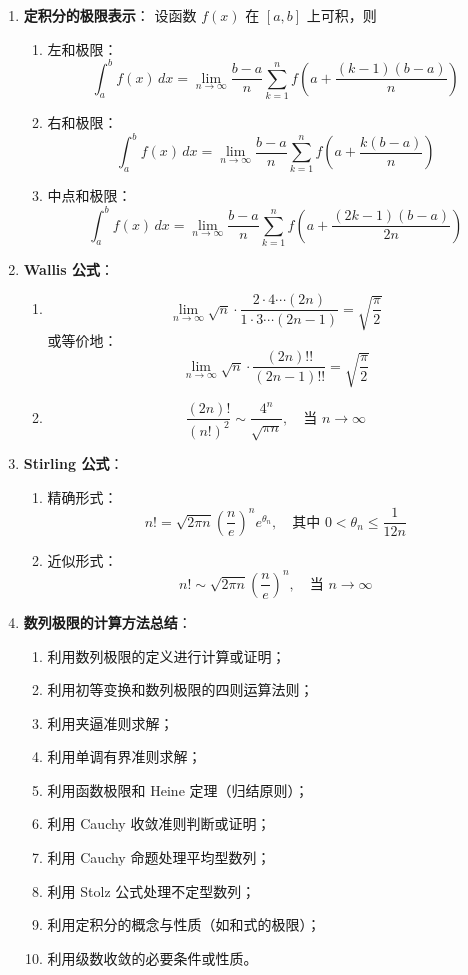 \documentclass[UTF8]{ctexart}
\theoremstyle{remark}
\begin{document}
\begin{enumerate}
				\item \textbf{定积分的极限表示}：
				设函数 $ f(x) $ 在 $[a, b]$ 上可积，则
				\begin{enumerate}
					\item 左和极限：
					$$
					\int_a^b f(x)\,dx = \lim_{n \to \infty} \frac{b - a}{n} \sum_{k=1}^{n} f\left(a + \frac{(k - 1)(b - a)}{n}\right)
					$$
					\item 右和极限：
					$$
					\int_a^b f(x)\,dx = \lim_{n \to \infty} \frac{b - a}{n} \sum_{k=1}^{n} f\left(a + \frac{k(b - a)}{n}\right)
					$$
					\item 中点和极限：
					$$
					\int_a^b f(x)\,dx = \lim_{n \to \infty} \frac{b - a}{n} \sum_{k=1}^{n} f\left(a + \frac{(2k - 1)(b - a)}{2n}\right)
					$$
				\end{enumerate}
				
				\item \textbf{Wallis 公式}：
				\begin{enumerate}
					\item
					$$
					\lim_{n \to \infty} \sqrt{n} \cdot \frac{2 \cdot 4 \cdots (2n)}{1 \cdot 3 \cdots (2n - 1)} = \sqrt{\frac{\pi}{2}}
					$$
					或等价地：
					$$
					\lim_{n \to \infty} \sqrt{n} \cdot \frac{(2n)!!}{(2n - 1)!!} = \sqrt{\frac{\pi}{2}}
					$$
					\item
					$$
					\frac{(2n)!}{(n!)^2} \sim \frac{4^n}{\sqrt{\pi n}}, \quad \text{当 } n \to \infty
					$$
				\end{enumerate}
				
				\item \textbf{Stirling 公式}：
				\begin{enumerate}
					\item 精确形式：
					$$
					n! = \sqrt{2\pi n} \left(\frac{n}{e}\right)^n e^{\theta_n}, \quad \text{其中 } 0 < \theta_n \leq \frac{1}{12n}
					$$
					\item 近似形式：
					$$
					n! \sim \sqrt{2\pi n} \left(\frac{n}{e}\right)^n, \quad \text{当 } n \to \infty
					$$
				\end{enumerate}
				
				\item \textbf{数列极限的计算方法总结}：
				\begin{enumerate}
					\item 利用数列极限的定义进行计算或证明；
					\item 利用初等变换和数列极限的四则运算法则；
					\item 利用夹逼准则求解；
					\item 利用单调有界准则求解；
					\item 利用函数极限和 Heine 定理（归结原则）；
					\item 利用 Cauchy 收敛准则判断或证明；
					\item 利用 Cauchy 命题处理平均型数列；
					\item 利用 Stolz 公式处理不定型数列；
					\item 利用定积分的概念与性质（如和式的极限）；
					\item 利用级数收敛的必要条件或性质。
				\end{enumerate}
			\end{enumerate}
\end{document}
